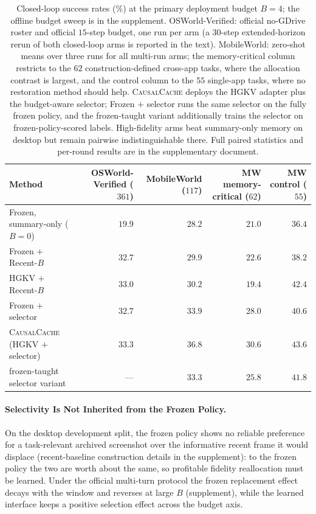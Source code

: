 \documentclass[letterpaper]{article} %
\newcommand{\method}{\textsc{CausalCache}}
\newcommand{\hgkv}{\textsc{HGKV}}
\begin{document}
\begin{table}[!t]
\centering
{\small
\setlength{\tabcolsep}{5.0pt}
\begin{tabular*}{\textwidth}{@{\extracolsep{\fill}}lrrrr@{}}
\toprule
Method & OSWorld-Verified ($361$) & MobileWorld ($117$) &
MW memory-critical ($62$) & MW control ($55$) \\
\midrule
Frozen, summary-only ($B{=}0$) & $19.9$ & $28.2$ & $21.0$ & $36.4$ \\
Frozen $+$ Recent-$B$ & $32.7$ & $29.9$ & $22.6$ & $38.2$ \\
\hgkv{} $+$ Recent-$B$ & $33.0$ & $30.2$ & $19.4$ & $42.4$ \\
Frozen $+$ selector & $32.7$ & $33.9$ & $28.0$ & $40.6$ \\
\method{} (\hgkv{} $+$ selector) & $\mathbf{33.3}$ & $\mathbf{36.8}$ &
$\mathbf{30.6}$ & $\mathbf{43.6}$ \\
\hspace{7pt}frozen-taught selector variant & --- & $33.3$ & $25.8$ & $41.8$ \\
\bottomrule
\end{tabular*}
}
\caption{Closed-loop success rates (\%) at the primary deployment budget
$B{=}4$; the offline budget sweep is in the supplement.
OSWorld-Verified: official no-GDrive roster and official $15$-step budget,
one run per arm (a $30$-step extended-horizon rerun of both closed-loop
arms is reported in the text). MobileWorld: zero-shot means over three
runs for all multi-run arms; the memory-critical column restricts to the $62$
construction-defined cross-app tasks, where the allocation contrast is
largest, and the control column to the $55$ single-app tasks, where no
restoration method should help. \method{} deploys the \hgkv{} adapter
plus the budget-aware selector; Frozen $+$ selector runs the same
selector on the fully frozen policy, and the frozen-taught variant
additionally trains the selector on frozen-policy-scored labels.
High-fidelity arms beat summary-only memory on desktop but remain
pairwise indistinguishable there. Full paired statistics and per-round
results are in the supplementary document.}
\label{tab:closed-loop}
\end{table}

\paragraph{Selectivity Is Not Inherited from the Frozen Policy.}

On the desktop development split, the frozen policy shows no reliable
preference for a task-relevant archived screenshot over the informative
recent frame it would displace (recent-baseline construction details in
the supplement): to the frozen policy the two are worth about the same,
so profitable fidelity reallocation must be learned. Under the official
multi-turn protocol the frozen replacement effect decays with the window
and reverses at large $B$ (supplement), while the learned
interface keeps a positive selection effect across the budget axis.
\end{document}
